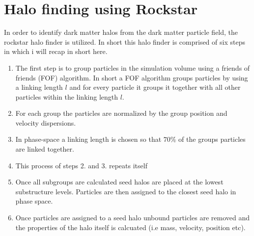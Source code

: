 \section{Halo finding using Rockstar}
In order to identify dark matter halos from the dark matter particle field, the rockstar halo finder\cite{rockstar} is utilized. In short this halo finder is comprised of six steps in which i will recap in short here.
\begin{enumerate}
    \item The first step is to group particles in the simulation volume using a friends of friends (FOF) algorithm. In short a FOF algorithm groups particles by using a linking length $l$ and for every particle it groups it together with all other particles within the linking length $l$.
    \item For each group the particles are normalized by the group position and velocity dispersions.
    \item In phase-space a linking length is chosen so that $70$\% of the groups particles are linked together.
    \item This process of steps 2. and 3. repeats itself
    \item Once all subgroups are calculated seed halos are placed at the lowest substructure levels. Particles are then assigned to the closest seed halo in phase space.
    \item Once particles are assigned to a seed halo unbound particles are removed and the properties of the halo itself is calcuated (i.e mass, velocity, position etc).
\end{enumerate}
